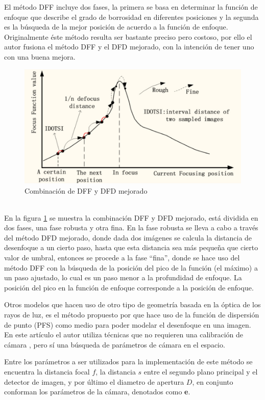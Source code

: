 El método DFF incluye dos fases, la primera se basa en determinar la función de enfoque que describe el grado de borrosidad en diferentes posiciones y la segunda es la búsqueda de la mejor posición de acuerdo a la función de enfoque. Originalmente éste método resulta ser bastante preciso pero costoso, por ello el autor fusiona el método DFF y el DFD mejorado, con la intención de tener uno con una buena mejora.
\\
\begin{figure}[ht]
\centering
\includegraphics[scale=0.50]{GraficosEdArt/FocusFunctionValue.PNG} 
\caption{Combinación de DFF y DFD mejorado \citet{Zhang:14}}
\label{fig4}
\end{figure}
\\
En la figura \ref{fig4} se muestra la combinación DFF y DFD mejorado, está dividida en dos fases, una fase robusta y otra fina. En la fase robusta se lleva a cabo a través del método DFD mejorado, donde dada dos imágenes se calcula la distancia de desenfoque a un cierto paso, hasta que esta distancia sea más pequeña que cierto valor de umbral, entonces se procede a la fase “fina”, donde se hace uso del método DFF con la búsqueda de la posición del pico de la función (el máximo) a un paso ajustado, lo cual es un paso menor a la profundidad de enfoque. La posición del pico en la función de enfoque corresponde a la posición de enfoque.

Otros modelos que hacen uso de otro tipo de geometría basada en la óptica de los rayos de luz, es el método propuesto por \citet{Subbarao1993} que hace uso de la función de dispersión de punto (PFS) como medio para poder modelar el desenfoque en una imagen. En este artículo el autor utiliza técnicas que no requieren una calibración de cámara , pero sí una búsqueda de parámetros de cámara en el espacio. 

Entre los parámetros a ser utilizados para la implementación de este método se encuentra la distancia focal $f$, la distancia $s$ entre el segundo plano principal y el detector de imagen, y por último el diametro de apertura $D$, en conjunto conforman los parámetros de la cámara, denotados como \textbf{e}.


